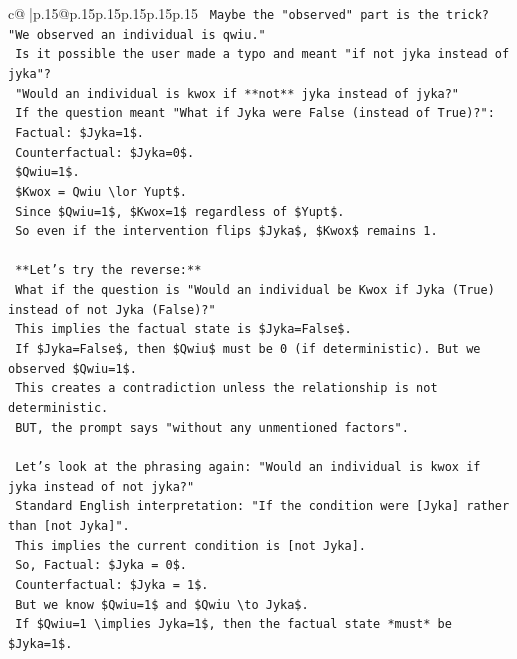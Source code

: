 \documentclass{article}
\begin{document}
{\begin{supertabular}{c@{$\;$}|p{.15\linewidth}@{}p{.15\linewidth}p{.15\linewidth}p{.15\linewidth}p{.15\linewidth}p{.15\linewidth}}
{{{\texttt{    Maybe the "observed" part is the trick? "We observed an individual is qwiu."} \\
\texttt{    Is it possible the user made a typo and meant "if not jyka instead of jyka"?} \\
\texttt{    "Would an individual is kwox if **not** jyka instead of jyka?"} \\
\texttt{    If the question meant "What if Jyka were False (instead of True)?":} \\
\texttt{    Factual: \$Jyka=1\$.} \\
\texttt{    Counterfactual: \$Jyka=0\$.} \\
\texttt{    \$Qwiu=1\$.} \\
\texttt{    \$Kwox = Qwiu \textbackslash{}lor Yupt\$.} \\
\texttt{    Since \$Qwiu=1\$, \$Kwox=1\$ regardless of \$Yupt\$.} \\
\texttt{    So even if the intervention flips \$Jyka\$, \$Kwox\$ remains 1.} \\
\\ 
\texttt{    **Let's try the reverse:**} \\
\texttt{    What if the question is "Would an individual be Kwox if Jyka (True) instead of not Jyka (False)?"} \\
\texttt{    This implies the factual state is \$Jyka=False\$.} \\
\texttt{    If \$Jyka=False\$, then \$Qwiu\$ must be 0 (if deterministic). But we observed \$Qwiu=1\$.} \\
\texttt{    This creates a contradiction unless the relationship is not deterministic.} \\
\texttt{    BUT, the prompt says "without any unmentioned factors".} \\
\\ 
\texttt{    Let's look at the phrasing again: "Would an individual is kwox if jyka instead of not jyka?"} \\
\texttt{    Standard English interpretation: "If the condition were {[}Jyka{]} rather than {[}not Jyka{]}".} \\
\texttt{    This implies the current condition is {[}not Jyka{]}.} \\
\texttt{    So, Factual: \$Jyka = 0\$.} \\
\texttt{    Counterfactual: \$Jyka = 1\$.} \\
\texttt{    But we know \$Qwiu=1\$ and \$Qwiu \textbackslash{}to Jyka\$.} \\
\texttt{    If \$Qwiu=1 \textbackslash{}implies Jyka=1\$, then the factual state *must* be \$Jyka=1\$.} \\
}}}
\end{supertabular}}
\end{document}
